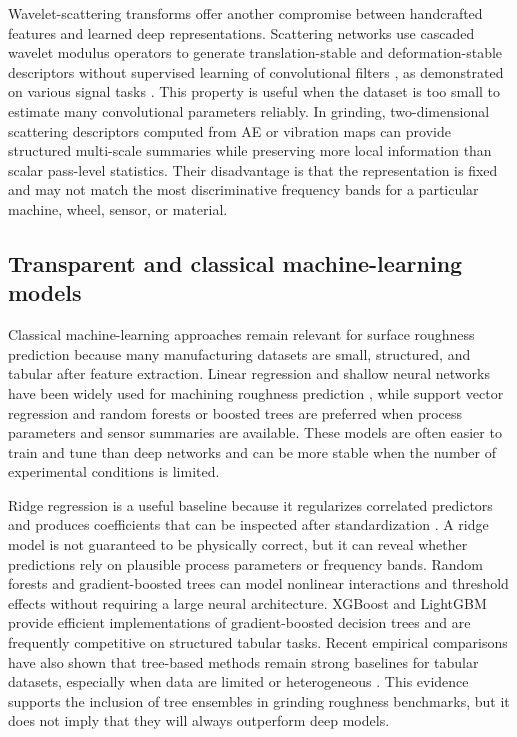 Wavelet-scattering transforms offer another compromise between handcrafted features and learned deep representations. Scattering networks use cascaded wavelet modulus operators to generate translation-stable and deformation-stable descriptors without supervised learning of convolutional filters \cite{mallat2012group}, as demonstrated on various signal tasks \cite{Anden2014}. This property is useful when the dataset is too small to estimate many convolutional parameters reliably. In grinding, two-dimensional scattering descriptors computed from AE or vibration maps can provide structured multi-scale summaries while preserving more local information than scalar pass-level statistics. Their disadvantage is that the representation is fixed and may not match the most discriminative frequency bands for a particular machine, wheel, sensor, or material.

\subsection{Transparent and classical machine-learning models}\label{rw:transparent-ml}

Classical machine-learning approaches remain relevant for surface roughness prediction because many manufacturing datasets are small, structured, and tabular after feature extraction. Linear regression and shallow neural networks have been widely used for machining roughness prediction \cite{Benardos2003}, while support vector regression \cite{Ozel2005} and random forests or boosted trees \cite{Wuest2016} are preferred when process parameters and sensor summaries are available. These models are often easier to train and tune than deep networks and can be more stable when the number of experimental conditions is limited.

Ridge regression is a useful baseline because it regularizes correlated predictors and produces coefficients that can be inspected after standardization \cite{Hoerl1970}. A ridge model is not guaranteed to be physically correct, but it can reveal whether predictions rely on plausible process parameters or frequency bands. Random forests \cite{Breiman2001} and gradient-boosted trees \cite{Friedman2001} can model nonlinear interactions and threshold effects without requiring a large neural architecture. XGBoost \cite{Chen2016} and LightGBM \cite{Ke2017} provide efficient implementations of gradient-boosted decision trees and are frequently competitive on structured tabular tasks. Recent empirical comparisons have also shown that tree-based methods remain strong baselines for tabular datasets, especially when data are limited \cite{shwartz2022tabular} or heterogeneous \cite{grinsztajn2022tree}. This evidence supports the inclusion of tree ensembles in grinding roughness benchmarks, but it does not imply that they will always outperform deep models.

